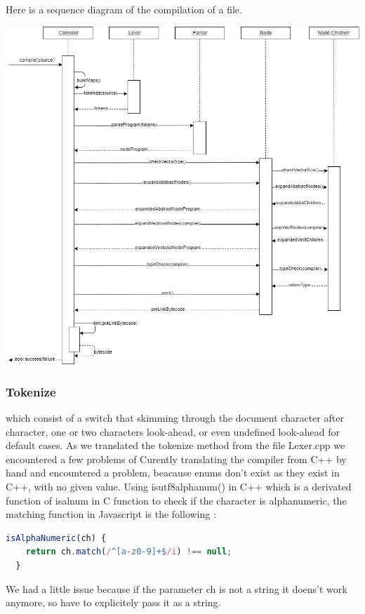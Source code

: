 \documentclass{scrartcl}
\begin{document}
Here is a sequence diagram of the compilation of a file.
\begin{center}
  \includegraphics[width=\textwidth]{./compiler_sequence_diagram}
\end{center}

\subsubsection{Tokenize}

which consist of a switch that skimming through the document character after character, one or two characters look-ahead,
or even undefined look-ahead for default cases.  
As we translated the tokenize method from the file Lexer.cpp we encountered a few problems of 
Curently translating the compiler from C++ by hand and encountered a problem, beacause enums don't exist as they exist in C++, with no given value. 
Using is\textunderscore utf8\textunderscore alpha\textunderscore num() in C++ which is a derivated function of isalnum in C function to check if the character is alphanumeric, the matching function in Javascript is the following :
\begin{lstlisting}[language=JavaScript, basicstyle=\ttfamily\small]
  isAlphaNumeric(ch) {
    return ch.match(/^[a-z0-9]+$/i) !== null;
  }
\end{lstlisting}

We had a little issue because if the parameter ch is not a string it doens't work anymore, so have to explicitely pass it as a string.
\end{document}
